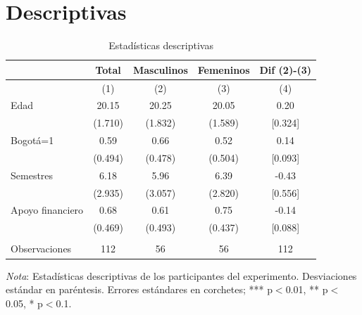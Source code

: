\section{Descriptivas}
\begin{table}[ht!]
        \centering
        \caption{Estadísticas descriptivas}
        \footnotesize{
        \begin{tabular}{l ccc c}\hline \hline
                &\multicolumn{1}{c}{Total}&\multicolumn{1}{c}{Masculinos}&\multicolumn{1}{c}{Femeninos}&\multicolumn{1}{c}{Dif (2)-(3)}\\\hline
                &\multicolumn{1}{c}{(1)}&\multicolumn{1}{c}{(2)}&\multicolumn{1}{c}{(3)}&\multicolumn{1}{c}{(4)}\\
            Edad      &    20.15&    20.25&    20.05&     0.20         \\
                            &  (1.710)&  (1.832)&  (1.589)&  [0.324]         \\
            Bogotá=1          &     0.59&     0.66&     0.52&     0.14         \\
                            &  (0.494)&  (0.478)&  (0.504)&  [0.093]         \\
            Semestres &     6.18&     5.96&     6.39&    -0.43         \\
                            &  (2.935)&  (3.057)&  (2.820)&  [0.556]         \\
            Apoyo financiero&     0.68&     0.61&     0.75&    -0.14         \\
                            &  (0.469)&  (0.493)&  (0.437)&  [0.088]         \\
                             &          &       &           &               \\
            Observaciones    &      112&       56&       56&      112         \\\hline \hline

        \end{tabular}}
        \begin{threeparttable} 
        \begin{tablenotes}
        \footnotesize{
        \item \textit{Nota}: Estadísticas descriptivas de los participantes del experimento. Desviaciones estándar en paréntesis. Errores estándares en corchetes; *** p$<$0.01, ** p$<$0.05, * p$<$0.1.}
        \end{tablenotes}
        \end{threeparttable}
    \end{table}

